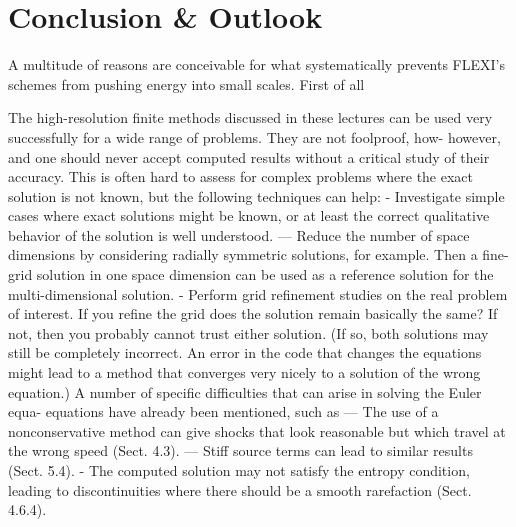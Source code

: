 \section{Conclusion \& Outlook}

A multitude of reasons are conceivable for what systematically prevents FLEXI's
schemes from pushing energy into small scales. First of all

The high-resolution finite methods discussed in these lectures can be used
very successfully for a wide range of problems. They are not foolproof, how-
however, and one should never accept computed results without a critical study
of their accuracy. This is often hard to assess for complex problems where
the exact solution is not known, but the following techniques can help:
- Investigate simple cases where exact solutions might be known, or at least
the correct qualitative behavior of the solution is well understood.
— Reduce the number of space dimensions by considering radially symmetric
solutions, for example. Then a fine-grid solution in one space dimension
can be used as a reference solution for the multi-dimensional solution.
- Perform grid refinement studies on the real problem of interest. If you
refine the grid does the solution remain basically the same? If not, then
you probably cannot trust either solution. (If so, both solutions may still
be completely incorrect. An error in the code that changes the equations
might lead to a method that converges very nicely to a solution of the
wrong equation.)
A number of specific difficulties that can arise in solving the Euler equa-
equations have already been mentioned, such as
— The use of a nonconservative method can give shocks that look reasonable
but which travel at the wrong speed (Sect. 4.3).
— Stiff source terms can lead to similar results (Sect. 5.4).
- The computed solution may not satisfy the entropy condition, leading to
discontinuities where there should be a smooth rarefaction (Sect. 4.6.4).

